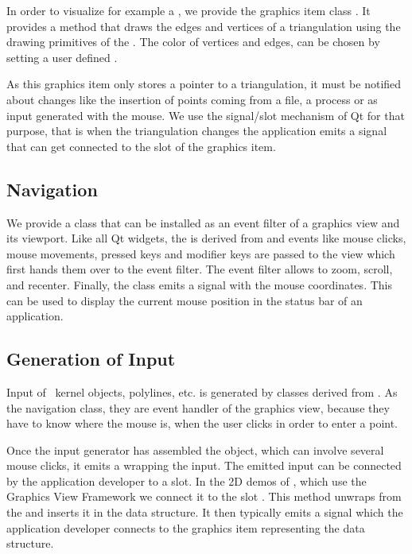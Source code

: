 In order to visualize for example a , we
provide the graphics item class .
It provides a  method that draws the edges and vertices of a triangulation
using the drawing primitives of the .   The color of vertices and edges, 
can be chosen by setting a user defined  .


As this graphics item only stores a pointer to a triangulation, it
must be notified about changes like the insertion of points coming from
a file, a process or as input generated with the mouse.  We
use the signal/slot mechanism of Qt for that purpose, that is when the
triangulation changes the application emits a signal that can get connected to the
 slot of the graphics item.



\subsection{Navigation}

We provide a class  that can be
installed as an event filter of a graphics view and its viewport. Like
all Qt widgets, the  is derived from
 and events like mouse clicks, mouse movements, pressed keys and 
modifier keys are passed to the view which first hands them over to the
event filter.  The  event filter allows to zoom, scroll, and recenter.
Finally, the class emits a signal with the mouse coordinates. This can be used
to display the current mouse position in the status bar of an application.

\subsection{Generation of Input}

Input of \cgal\ kernel objects, polylines, etc. is generated by classes derived
from .  As the navigation class, they are event handler of the
graphics view, because they have to know where the mouse is, when the user clicks
in order to enter a point.

Once the input generator has assembled the object, which can involve several mouse clicks,
it emits a  wrapping the input.  The emitted input can be connected
by the application developer to a slot. In the 2D demos of \cgal, which use the 
Graphics View Framework we connect it to the slot .
This method unwraps from the  and inserts it in the data structure. 
It then typically emits a signal  which the application developer 
connects to the graphics item representing the data structure.

